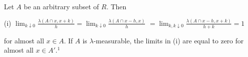 Let $A$ be an arbitrary subset of $R$. Then

(i) $\lim_{k \downarrow 0} \frac{\lambda(A \cap x, x + k)}{h} = \lim_{k \downarrow 0} \frac{\lambda(A \cap x - h, x)}{h}$
$= \lim_{k, k \downarrow 0} \frac{\lambda(A \cap x - h, x + k)}{h + k} = 1$

for almost all $x \in A$. If $A$ is $\lambda$-measurable, the limits in (i) are equal to zero for almost all $x \in A'$.$^1$